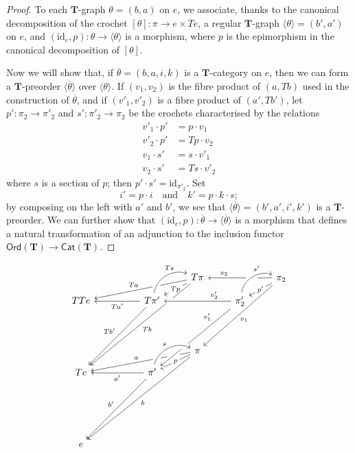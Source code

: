 \documentclass[fleqn]{article}
\newcommand{\oldpage}[1]{\marginpar{\footnotesize$\Big\vert$ \textit{p.~#1}}}
\newcommand{\id}{\mathrm{id}}
\newcommand{\TT}{\mathbf{T}}
\newcommand{\textand}{\quad\text{and}\quad}
\newcommand{\Cat}[1]{\mathsf{#1}}
\newcommand{\Ord}[1]{\Cat{Ord}(#1)}
\begin{document}
\begin{proof}
  To each $\TT$-graph $\theta=(b,a)$ on $e$, we associate, thanks to the canonical decomposition of the crochet $[\theta]\colon\pi\to e\times Te$, a regular $\TT$-graph $\langle\theta\rangle=(b',a')$ on $e$, and $(\id_e,p)\colon\theta\to\langle\theta\rangle$ is a morphism, where $p$ is the epimorphism in the canonical decomposition of $[\theta]$.

  Now we will show that, if $\overline{\theta}=(b,a,i,k)$ is a $\TT$-category on $e$, then we can form a $\TT$-preorder $\langle\overline{\theta}\rangle$ over $\langle\theta\rangle$.
  If $(v_1,v_2)$ is the fibre product of $(a,Tb)$ used in the construction of $\overline{\theta}$, and if $(v'_1,v'_2)$ is a fibre product of $(a',Tb')$, let $p'\colon\pi_2\to\pi'_2$ and $s'\colon\pi'_2\to\pi_2$ be the crochets characterised by the relations
  \[
    \begin{aligned}
      v'_1\cdot p'
    & = p\cdot v_1
    \\v'_2\cdot p'
    & = Tp\cdot v_2
    \\v_1\cdot s'
    & = s\cdot v'_1
    \\v_2\cdot s'
    & = Ts\cdot v'_2
    \end{aligned}
  \]
  where $s$ is a section of $p$;
  then $p'\cdot s'=\id_{\pi'_2}$.
  Set
  \[
    i' = p\cdot i
    \textand
    k' = p\cdot k\cdot s;
  \]
  by composing on the left with $a'$ and $b'$, we see that $\langle\overline{\theta}\rangle=(b',a',i',k')$ is a $\TT$-preorder.
  \oldpage{240}
  We can further show that $(\id_e,p)\colon\overline{\theta}\to\langle\overline{\theta}\rangle$ is a morphism that defines a natural transformation of an adjunction to the inclusion functor $\Ord{\TT}\to\Cat{Cat}(\TT)$.
\end{proof}

\[
  \begin{tikzcd}
  &&&T\pi
      \ar[dlll,swap,"Ta"]
      \ar[dl,"Tp"description]
      \ar[dddlll,"Tb"]
  &&\pi_2
      \ar[ll,near end,swap,"v_2"]
      \ar[dl,"p'"description]
      \ar[ddll,"v_1"]
  \\[-1em]TTe
  && T\pi'
      \ar[ur,bend left=50,near end,"Ts",crossing over]
      \ar[ll,"Ta'"]
      \ar[ddll,swap,"Tb'"]
  &&\pi'_2
      \ar[ur,bend left=50,near end,"s'",crossing over]
      \ar[ll,near start,swap,"v'_2",crossing over]
  \\[2em]
  &&&\pi
      \ar[dlll,swap,"a"]
      \ar[dl,"p"description]
      \ar[dddlll,"b"]
  \\[-1em]Te
  && \pi'
      \ar[from=2-5,near start,swap,"v'_1",crossing over]
      \ar[ll,"a'"]
      \ar[ddll,swap,"b'"]
      \ar[ur,bend left=50,"s",crossing over]
  \\{}
  \\[2em]e
  \end{tikzcd}
\]
\end{document}
